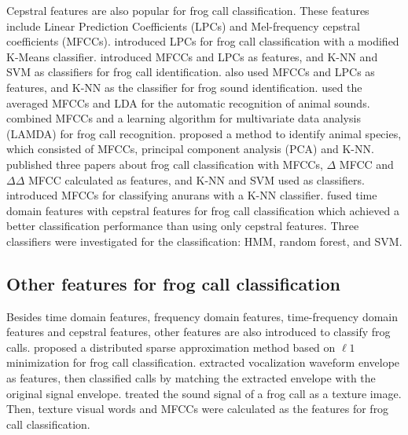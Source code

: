 Cepstral features are also popular for frog call classification. These features include Linear Prediction Coefficients (LPCs) and Mel-frequency cepstral coefficients (MFCCs). 
\cite{colombia2009frogs} introduced LPCs for frog call classification with a modified K-Means classifier. \cite{jaafarcomparative} introduced MFCCs and LPCs as features, and K-NN and SVM as classifiers for frog call identification. \cite{yuan2012frog} also used MFCCs and LPCs as features, and K-NN as the classifier for frog sound identification.
\cite{lee2006automatic} used the averaged MFCCs and LDA for the automatic recognition of animal sounds. \cite{bedoya2014automatic} combined MFCCs and a learning algorithm for multivariate data analysis (LAMDA) for frog call recognition. \cite{vaca2010using} proposed a method to identify animal species, which consisted of MFCCs, principal component analysis (PCA) and K-NN. \cite{jaafar2013, jaafar2013mfcc, tanintelligent2014} published three papers about frog call classification with MFCCs, $\Delta$ MFCC and $\Delta \Delta$ MFCC calculated as features, and K-NN and SVM used as classifiers. \cite{feature2012Colona} introduced MFCCs for classifying anurans with a K-NN classifier. \cite{Noda2016100} fused time domain features with cepstral features for frog call classification which achieved a better classification performance than using only cepstral features. Three classifiers were investigated for the classification: HMM, random forest, and SVM.


\subsection{Other features for frog call classification}
Besides time domain features, frequency domain features, time-frequency domain features and cepstral features, other features are also introduced to classify frog calls.
\cite{wei2012distributed} proposed a distributed sparse approximation method based on $\ell 1$ minimization for frog call classification. \cite{dang2008lightweight} extracted vocalization waveform envelope as features, then classified calls by matching the extracted envelope with the original signal envelope. \cite{kular2015classifying} treated the sound signal of a frog call as a texture image. Then, texture visual words and MFCCs were calculated as the features for frog call classification. 




